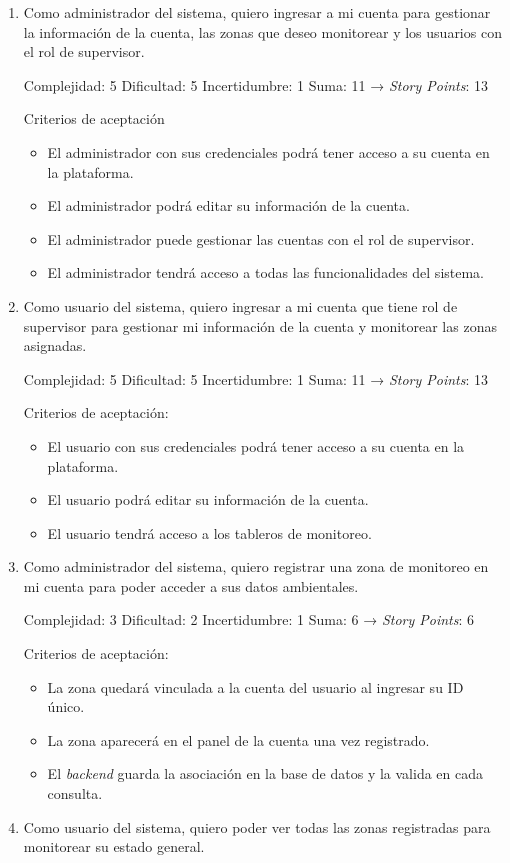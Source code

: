 \documentclass[
11pt, %
]{charter}
\begin{document}
\begin{enumerate}
	\item Como administrador del sistema, quiero ingresar a mi cuenta para gestionar la información de la cuenta, las zonas que deseo monitorear y los usuarios con el rol de supervisor.

	Complejidad: 5
	Dificultad: 5
	Incertidumbre: 1
	Suma: 11 → \textit{Story Points}: 13

	Criterios de aceptación
	\begin{itemize}
		\item El administrador con sus credenciales podrá tener acceso a su cuenta en la plataforma.
		\item El administrador podrá editar su información de la cuenta.
		\item El administrador puede gestionar las cuentas con el rol de supervisor.
		\item El administrador tendrá acceso a todas las funcionalidades del sistema.
	\end{itemize}
	
		\item Como usuario del sistema, quiero ingresar a mi cuenta que tiene rol de supervisor para gestionar mi información de la cuenta y monitorear las zonas asignadas.

	Complejidad: 5
	Dificultad: 5
	Incertidumbre: 1
	Suma: 11 → \textit{Story Points}: 13

	Criterios de aceptación:
	\begin{itemize}
		\item El usuario con sus credenciales podrá tener acceso a su cuenta en la plataforma.
		\item El usuario podrá editar su información de la cuenta.
		\item El usuario tendrá acceso a los tableros de monitoreo.
	\end{itemize}
	
		\item Como administrador del sistema, quiero registrar una zona de monitoreo en mi cuenta para poder acceder a sus datos ambientales.

	Complejidad: 3
	Dificultad: 2
	Incertidumbre: 1
	Suma: 6 → \textit{Story Points}: 6

	Criterios de aceptación:
	\begin{itemize}
		\item La zona quedará vinculada a la cuenta del usuario al ingresar su ID único.
		\item La zona aparecerá en el panel de la cuenta una vez registrado.
		\item El \textit{backend} guarda la asociación en la base de datos y la valida en cada consulta.
	\end{itemize}
	\item Como usuario del sistema, quiero poder ver todas las zonas registradas para monitorear su estado general.


\end{enumerate}
\end{document}
